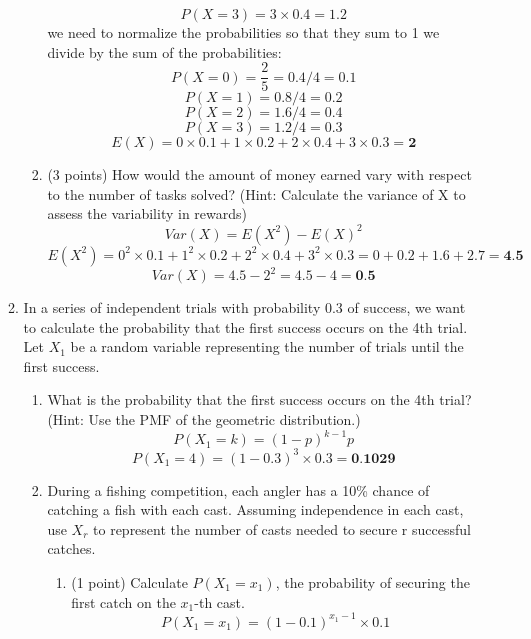 \documentclass[a3paper,12pt]{article} %
\begin{document}
\begin{enumerate}
\begin{enumerate}
\begin{enumerate}
            \[
                P(X = 3) = 3 \times 0.4 = 1.2
            \]
            we need to normalize the probabilities so that they sum to 1 we divide by the sum of the probabilities:
            \[
                    P(X = 0) = \frac{2}{5} = 0.4 / 4 = 0.1
            \]
            \[
                    P(X = 1) = 0.8 / \text{4} = 0.2
            \]
            \[
                    P(X = 2) = 1.6 / \text{4} = 0.4
            \]
            \[
                    P(X = 3) = 1.2 / \text{4} = 0.3
            \]
            \[
                E(X) = 0 \times 0.1 + 1 \times 0.2 + 2 \times 0.4 + 3 \times 0.3 = \textbf{2}
            \]
            \item (3 points) How would the amount of money earned vary with respect to the number of tasks solved? (Hint: Calculate the variance of X to assess the variability in rewards)
            \[
                Var(X) = E(X^2) - E(X)^2
            \]
            \[
                E(X^2) = 0^2 \times 0.1 + 1^2 \times 0.2 + 2^2 \times 0.4 + 3^2 \times 0.3 = 0 + 0.2 + 1.6 + 2.7 = \textbf{4.5}
            \]
            \[
                Var(X) = 4.5 - 2^2 = 4.5 - 4 = \textbf{0.5}
            \]
        \end{enumerate}
        \item In a series of independent trials with probability 0.3 of success, we want to calculate the probability that the first success occurs on the 4th trial. Let \(X_1\) be a random variable representing the number of trials until the first success.
        \begin{enumerate}
            \item What is the probability that the first success occurs on the 4th trial? (Hint: Use the PMF of the geometric distribution.)
            \[
            P(X_1 = k) = (1 - p)^{k-1} p
            \]
            \[
                P(X_1 = 4) = (1 - 0.3)^3 \times 0.3 = \textbf{0.1029}
            \]
            \item During a fishing competition, each angler has a 10\% chance of catching a fish with each cast.
            Assuming independence in each cast, use \(X_r\) to represent the number of casts needed to secure
            r successful catches.
            \begin{enumerate}
                \item (1 point) Calculate \(P(X_1 = x_1)\), the probability of securing the first catch on the \(x_1\)-th cast.
                \[
                    P(X_1 = x_1) = (1 - 0.1)^{x_1 - 1} \times 0.1
                \]

\end{enumerate}
\end{enumerate}
\end{enumerate}
\end{enumerate}
\end{document}
